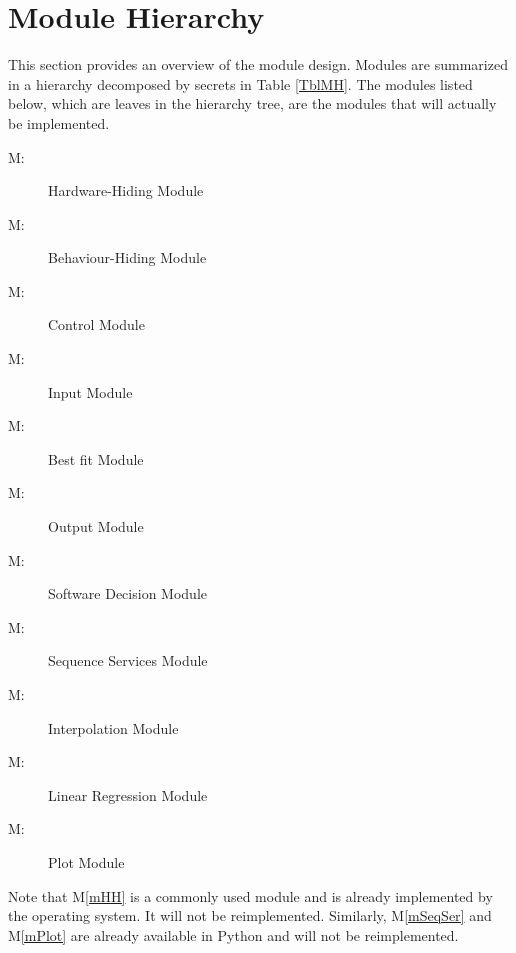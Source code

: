 \documentclass[12pt, titlepage]{article}
\newcounter{mnum}
\newcommand{\mthemnum}{M\themnum}
\newcommand{\mref}[1]{M\ref{#1}}
\begin{document}
\section{Module Hierarchy} \label{SecMH}

This section provides an overview of the module design. Modules are summarized
in a hierarchy decomposed by secrets in Table \ref{TblMH}. The modules listed
below, which are leaves in the hierarchy tree, are the modules that will
actually be implemented.

\begin{description}
\item [ \mthemnum \label{mHH}:] Hardware-Hiding Module
\item [ \mthemnum \label{mBH}:] Behaviour-Hiding Module
\item [ \mthemnum \label{mControl}:] Control Module
\item [ \mthemnum \label{mInput}:] Input Module

\item [ \mthemnum \label{mBestFit}:] Best fit Module
\item [ \mthemnum \label{mOutput}:] Output Module
\item [ \mthemnum \label{mSD}:] Software Decision Module
\item [ \mthemnum \label{mSeqSer}:] Sequence Services Module 
\item [ \mthemnum \label{mInterp}:] Interpolation Module
\item [ \mthemnum \label{mLinearReg}:] Linear Regression Module
\item [ \mthemnum \label{mPlot}:] Plot Module
\end{description}



Note that \mref{mHH} is a commonly used module and is already implemented by the operating system.  It will not be reimplemented.  Similarly, \mref{mSeqSer} and \mref{mPlot} are already available in Python and will not be reimplemented.
\end{document}
